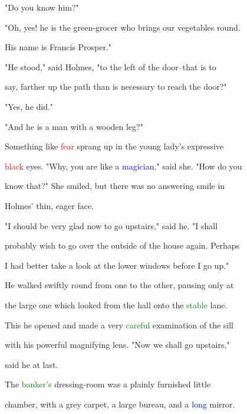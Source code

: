  "Do you know him?"



 "Oh, yes! he is the green-grocer who brings our vegetables round.

 His name is Francis \textcolor{BurntOrange}{Prosper."}



 "He stood," said Holmes, "to the left of the door--that is to

 say, farther up the path than is necessary to reach the door?"



 "Yes, he did."



 "And he is a man with a wooden leg?"



 Something like \textcolor{red}{fear} sprang up in the \textcolor{BurntOrange}{young} lady's expressive

 \textcolor{red}{black} eyes. "Why, you are like a \textcolor{blue}{magician,"} said she. "How do you

 know that?" She \textcolor{BurntOrange}{smiled,} but there was no answering \textcolor{BurntOrange}{smile} in

 Holmes' thin, \textcolor{BurntOrange}{eager} face.



 "I should be very \textcolor{BurntOrange}{glad} now to go upstairs," said he. "I shall

 probably wish to go over the outside of the house again. Perhaps

 I had better take a look at the lower windows before I go up."



 He walked swiftly round from one to the other, pausing only at

 the large one which looked from the hall onto the \textcolor{green}{stable} lane.

 This he opened and made a very \textcolor{green}{careful} \textcolor{BurntOrange}{examination} of the sill

 with his \textcolor{BurntOrange}{powerful} magnifying lens. "Now we shall go upstairs,"

 said he at last.



 The \textcolor{green}{banker's} dressing-room was a plainly furnished little

 chamber, with a grey carpet, a large bureau, and a \textcolor{blue}{long} mirror.

